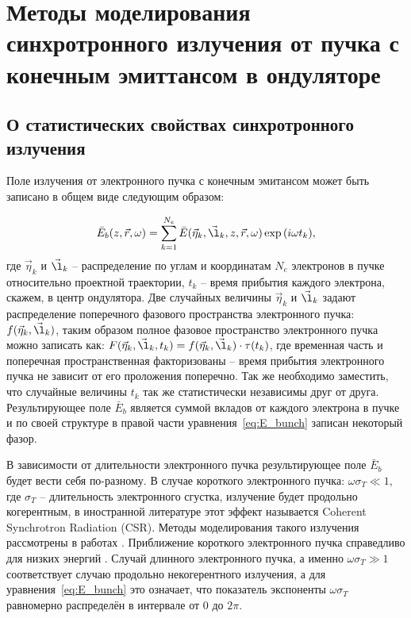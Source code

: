 
\chapter{Методы моделирования синхротронного излучения от пучка с конечным эмиттансом в ондуляторе} \label{chapt2}
\section{О статистических свойствах синхротронного излучения}
Поле излучения от электронного пучка с конечным эмитансом может быть записано в общем виде следующим образом: 

\begin{align}
	\bar{E}_{b} (z, \vec{r}, \omega) = \sum\limits_{k=1}^{N_e} \bar{E}(\vec{\eta}_k, \vec{\l}_k, z, \vec{r}, \omega) \exp{(i \omega t_k)},
	\label{eq:E_bunch} 
\end{align}
где $\vec{\eta}_k$ и $\vec{\l}_k$ -- распределение по углам и координатам $N_e$ электронов в пучке относительно проектной траектории, $t_k$ -- время прибытия каждого электрона, скажем, в центр ондулятора. Две случайных величины $\vec{\eta}_k$ и $\vec{\l}_k$ задают распределение поперечного фазового пространства электронного пучка: $f(\vec{\eta}_k, \vec{\l}_k)$, таким образом полное фазовое пространство электронного пучка можно записать как: $F(\vec{\eta}_k, \vec{\l}_k, t_k) = f(\vec{\eta}_k, \vec{\l}_k) \cdot \tau(t_k)$, где временная часть и поперечная пространственная факторизованы -- время прибытия электронного пучка не зависит от его проложения поперечно. Так же необходимо заместить, что случайные величины $t_k$ так же статистически независимы друг от друга. Результирующее поле $\bar{E}_{b}$ является суммой вкладов от каждого электрона в пучке и по своей структуре в правой части уравнения~\ref{eq:E_bunch} записан некоторый фазор. 

В зависимости от длительности электронного пучка результирующее поле $\bar{E}_{b}$ будет вести себя по-разному. В случае короткого электронного пучка: $\omega \sigma_T \ll 1$, где $\sigma_T$ -- длительность электронного сгустка, излучение будет продольно когерентным, в иностранной литературе этот эффект называется Coherent Synchrotron Radiation (CSR). Методы моделирования такого излучения рассмотрены в работах . Приближение короткого электронного пучка справедливо для низких энергий . Случай длинного электронного пучка, а именно  $\omega \sigma_T \gg 1$ соответствует случаю продольно некогерентного излучения, а для уравнения~\ref{eq:E_bunch} это означает, что показатель экспоненты $\omega \sigma_T$ равномерно распределён в интервале от $0$ до $2 \pi$. 


